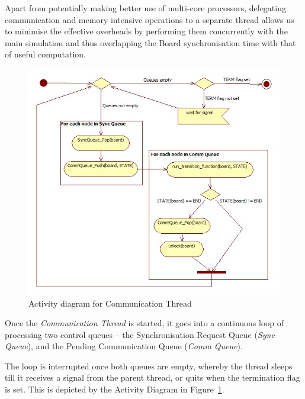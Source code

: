 Apart from potentially making better use of multi-core processors, delegating communication and memory intensive operations to a separate thread allows us to minimise the effective overheads by performing them concurrently with the main simulation and thus overlapping the Board synchronisation time with that of useful computation.

\begin{figure}[h]
 \centering
  \includegraphics[scale=0.60]{commloop.jpg}
 \caption{Activity diagram for Communication Thread}
 \label{fig:commloop}
\end{figure}

Once the \textit{Communication Thread} is started, it goes into a continuous loop of processing two control queues -- the Synchronisation Request Queue (\textit{Sync Queue}), and the Pending Communication Queue (\textit{Comm Queue}). 

The loop is interrupted once both queues are empty, whereby the thread sleeps till it receives a signal from the parent thread, or quits when the termination flag is set. This is depicted by the Activity Diagram in Figure~\ref{fig:commloop}.



